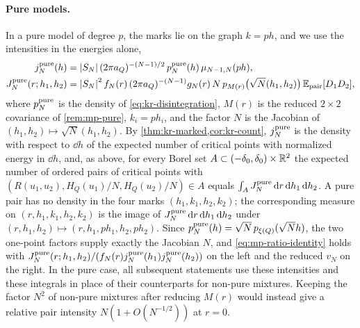 \paragraph{Pure models.}
In a pure model of degree $p$, the marks lie on the graph $k=ph$, and we use the intensities in the energies alone,
\begin{equation}\label{eq:mp-pure-intensities}
\begin{aligned}
j_N^{\rm pure}(h)&=\left|S_N\right|(2\pi a_Q)^{-(N-1)/2}\,p^{\rm pure}_N(h)\,\mu_{N-1,N}(ph),\\
J_N^{\rm pure}(r;h_1,h_2)&=\left|S_N\right|^2f_N(r)\,(2\pi a_Q)^{-(N-1)}g_N(r)\,N\,p_{M(r)}\bigl(\sqrt N(h_1,h_2)\bigr)\,\mathbb E_{\mathrm{pair}}[D_1D_2],
\end{aligned}
\end{equation}
where $p^{\rm pure}_N$ is the density of \eqref{eq:kr-disintegration}, $M(r)$ is the reduced $2\times2$ covariance of \cref{rem:mp-pure}, $k_i=ph_i$, and the factor $N$ is the Jacobian of $(h_1,h_2)\mapsto\sqrt N(h_1,h_2)$. By \cref{thm:kr-marked,cor:kr-count}, $j_N^{\rm pure}$ is the density with respect to $\dd h$ of the expected number of critical points with normalized energy in $\dd h$, and, as above, for every Borel set $A\subset(-\delta_0,\delta_0)\times\mathbb R^2$ the expected number of ordered pairs of critical points with $(R(u_1,u_2),H_Q(u_1)/N,H_Q(u_2)/N)\in A$ equals $\int_AJ_N^{\rm pure}\,\mathrm d r\,\mathrm d h_1\,\mathrm d h_2$. A pure pair has no density in the four marks $(h_1,k_1,h_2,k_2)$; the corresponding measure on $(r,h_1,k_1,h_2,k_2)$ is the image of $J_N^{\rm pure}\,\mathrm d r\,\mathrm d h_1\,\mathrm d h_2$ under $(r,h_1,h_2)\mapsto(r,h_1,ph_1,h_2,ph_2)$. Since $p^{\rm pure}_N(h)=\sqrt N\,p_{\xi(Q)}(\sqrt Nh)$, the two one-point factors supply exactly the Jacobian $N$, and \eqref{eq:mp-ratio-identity} holds with $J_N^{\rm pure}(r;h_1,h_2)/(f_N(r)j_N^{\rm pure}(h_1)j_N^{\rm pure}(h_2))$ on the left and the reduced $v_N$ on the right. In the pure case, all subsequent statements use these intensities and these integrals in place of their counterparts for non-pure mixtures. Keeping the factor $N^2$ of non-pure mixtures after reducing $M(r)$ would instead give a relative pair intensity $N(1+O(N^{-1/2}))$ at $r=0$.

